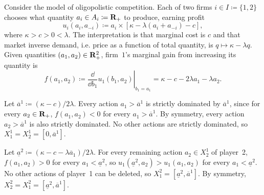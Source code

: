 \begin{example}
	\label{example:cournot}
	Consider the \textcite{Cournot1838} model of oligopolistic competition. Each of two firms $i \in I \coloneqq \{1,2\}$ chooses what quantity $a_i \in A_i \coloneqq \mathbf{R}_+$ to produce, earning profit 
	\begin{equation*}
		u_i(a_i,a_{-i})
		\coloneqq a_i \times \left[ \kappa - \lambda(a_i+a_{-i}) - c \right] ,
	\end{equation*}
	where $\kappa > c > 0 < \lambda$. The interpretation is that marginal cost is $c$ and that market inverse demand, i.e. price as a function of total quantity, is $q \mapsto \kappa - \lambda q$.
	Given quantities $(a_1,a_2) \in \mathbf{R}_+^2$, firm~$1$'s marginal gain from increasing its quantity is
	\begin{equation*}
		f(a_1,a_2) \coloneqq
		\left. \frac{\dd}{\dd b_1}
		u_1(b_1,a_2)
		\right|_{b_1=a_1}
		= \kappa - c - 2 \lambda a_1 - \lambda a_2 .
	\end{equation*}

	Let $\overline{a}^1 \coloneqq (\kappa-c)/2\lambda$. Every action $a_1 > \overline{a}^1$ is strictly dominated by $\overline{a}^1$, since for every $a_2 \in \mathbf{R}_+$, $f(a_1,a_2) < 0$ for every $a_1 > \overline{a}^1$. By symmetry, every action $a_2 > \overline{a}^1$ is also strictly dominated. No other actions are strictly dominated, so $X^1_1 = X^1_2 = \left[ 0, \overline{a}^1 \right]$.

	Let $\underline{a}^2 \coloneqq \left( \kappa - c - \lambda \overline{a}_1 \right) / 2 \lambda$. For every remaining action $a_2 \in X^1_2$ of player~2, $f(a_1,a_2) > 0$ for every $a_1 < \underline{a}^2$, so $u_1\left( \underline{a}^2, a_2 \right) > u_1(a_1,a_2)$ for every $a_1 < \underline{a}^2$. No other actions of player~1 can be deleted, so $X^2_1 = \left[ \underline{a}^2, \overline{a}^1 \right]$. By symmetry, $X^2_2 = X^2_1 = \left[ \underline{a}^2, \overline{a}^1 \right]$.


\end{example}
